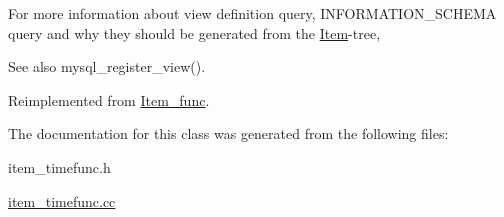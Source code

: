 For more information about view definition query, I\+N\+F\+O\+R\+M\+A\+T\+I\+O\+N\+\_\+\+S\+C\+H\+E\+MA query and why they should be generated from the \mbox{\hyperlink{classItem}{Item}}-\/tree, \begin{DoxySeeAlso}{See also}
mysql\+\_\+register\+\_\+view(). 
\end{DoxySeeAlso}


Reimplemented from \mbox{\hyperlink{classItem__func_afb302ee25d4721ace27d3f5053d4ee41}{Item\+\_\+func}}.



The documentation for this class was generated from the following files\+:\begin{DoxyCompactItemize}
\item 
item\+\_\+timefunc.\+h\item 
\mbox{\hyperlink{item__timefunc_8cc}{item\+\_\+timefunc.\+cc}}\end{DoxyCompactItemize}
